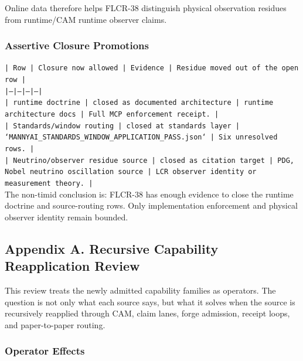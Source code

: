 \documentclass[11pt]{article}
\begin{document}
Online data therefore helps FLCR-38 distinguish physical observation residues from runtime/CAM runtime observer claims.

\subsubsection*{Assertive Closure Promotions}

\noindent\texttt{| Row | Closure now allowed | Evidence | Residue moved out of the open row |}\\
\noindent\texttt{|---|---|---|---|}\\
\noindent\texttt{| runtime doctrine | closed as documented architecture | runtime architecture docs | Full MCP enforcement receipt. |}\\
\noindent\texttt{| Standards/window routing | closed at standards layer | `MANNYAI\_STANDARDS\_WINDOW\_APPLICATION\_PASS.json` | Six unresolved rows. |}\\
\noindent\texttt{| Neutrino/observer residue source | closed as citation target | PDG, Nobel neutrino oscillation source | LCR observer identity or measurement theory. |}\\

The non-timid conclusion is: FLCR-38 has enough evidence to close the runtime doctrine and source-routing rows. Only implementation enforcement and physical observer identity remain bounded.

\subsection*{Appendix A. Recursive Capability Reapplication Review}

This review treats the newly admitted capability families as operators. The question is not only what each source says, but what it solves when the source is recursively reapplied through CAM, claim lanes, forge admission, receipt loops, and paper-to-paper routing.

\subsubsection*{Operator Effects}
\end{document}
